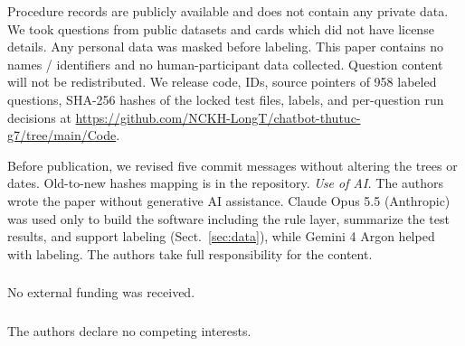 \documentclass[runningheads]{llncs}
\begin{document}
{Procedure records are publicly available and does not contain any private data. We took questions from public datasets and cards which did not have license details. Any personal data was masked before labeling. This paper contains no names / identifiers and no human-participant data collected. Question content will not be redistributed. We release code, IDs, source pointers of 958 labeled questions, SHA-256 hashes of the locked test files, labels, and per-question run decisions at \url{https://github.com/NCKH-LongT/chatbot-thutuc-g7/tree/main/Code}.}

{Before publication, we revised five commit messages without altering the trees or dates. Old-to-new hashes mapping is in the repository.}
{\emph{Use of AI.} The authors wrote the paper without generative AI assistance. Claude Opus 5.5 (Anthropic) was used only to build the software including the rule layer, summarize the test results, and support labeling (Sect.~\ref{sec:data}), while Gemini 4 Argon helped with labeling. The authors take full responsibility for the content.}

\begin{credits}
\subsubsection{\ackname} 
{No external funding was received.}

\subsubsection{\discintname} 
{The authors declare no competing interests.}
\end{credits}

\nocite{dvcportal,kaplan2026,samson2026,wen2025,kamath2020,larson2019,phamduy2023,dwork2015,gorman2019,nguyen2020phobert,vigptqa2023,hien2025,alqac2021,elyaniv2010,geifman2017,chow1970,hendrycks2017,aliannejadi2019,lewis2020,asai2024,rebedea2023,chiticariu2013,vanmiltenburg2021,dodge2019,gilardi2023,pangakis2023,reiss2023,hfdvc,hfmps,cohen1960,brodersen2010,wilson1927,mcnemar1947,dietterich1998,connor1987,schuirmann1987,chen2024m3,bgererank,qwen3inst}


\end{document}
